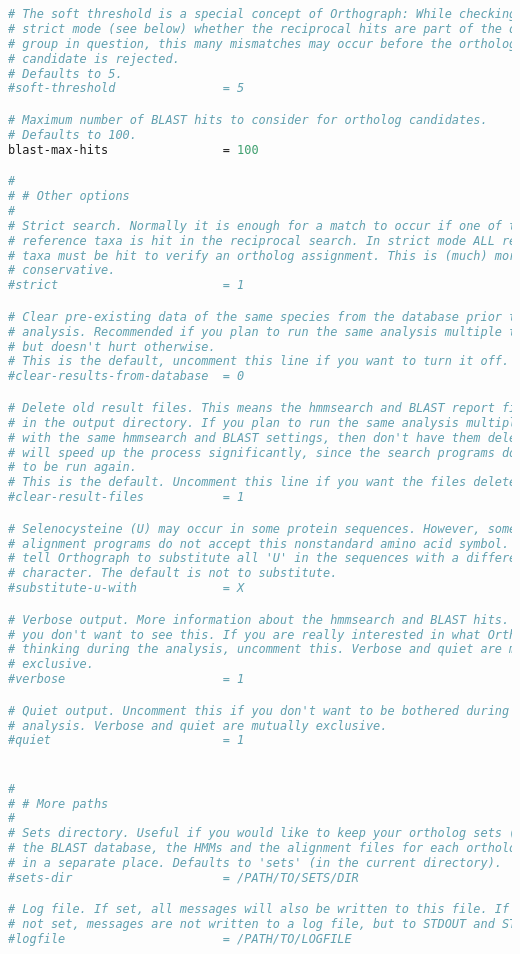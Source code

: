 \begin{lstlisting}[language=perl]
# The soft threshold is a special concept of Orthograph: While checking in
# strict mode (see below) whether the reciprocal hits are part of the ortholog
# group in question, this many mismatches may occur before the ortholog
# candidate is rejected.
# Defaults to 5.
#soft-threshold               = 5

# Maximum number of BLAST hits to consider for ortholog candidates.
# Defaults to 100.
blast-max-hits                = 100

# 
# # Other options
#
# Strict search. Normally it is enough for a match to occur if one of the
# reference taxa is hit in the reciprocal search. In strict mode ALL reference
# taxa must be hit to verify an ortholog assignment. This is (much) more
# conservative.
#strict                       = 1

# Clear pre-existing data of the same species from the database prior to the
# analysis. Recommended if you plan to run the same analysis multiple times,
# but doesn't hurt otherwise. 
# This is the default, uncomment this line if you want to turn it off.
#clear-results-from-database  = 0

# Delete old result files. This means the hmmsearch and BLAST report files found
# in the output directory. If you plan to run the same analysis multiple times
# with the same hmmsearch and BLAST settings, then don't have them deleted. This
# will speed up the process significantly, since the search programs don't have
# to be run again.
# This is the default. Uncomment this line if you want the files deleted.
#clear-result-files           = 1

# Selenocysteine (U) may occur in some protein sequences. However, some
# alignment programs do not accept this nonstandard amino acid symbol. You can
# tell Orthograph to substitute all 'U' in the sequences with a different
# character. The default is not to substitute.
#substitute-u-with            = X

# Verbose output. More information about the hmmsearch and BLAST hits. Normally
# you don't want to see this. If you are really interested in what Orthograph is
# thinking during the analysis, uncomment this. Verbose and quiet are mutually
# exclusive.
#verbose                      = 1

# Quiet output. Uncomment this if you don't want to be bothered during the
# analysis. Verbose and quiet are mutually exclusive.
#quiet                        = 1


#
# # More paths
# 
# Sets directory. Useful if you would like to keep your ortholog sets (that is,
# the BLAST database, the HMMs and the alignment files for each ortholog gene)
# in a separate place. Defaults to 'sets' (in the current directory).
#sets-dir                     = /PATH/TO/SETS/DIR

# Log file. If set, all messages will also be written to this file. If this is
# not set, messages are not written to a log file, but to STDOUT and STDERR.
#logfile                      = /PATH/TO/LOGFILE
\end{lstlisting}
